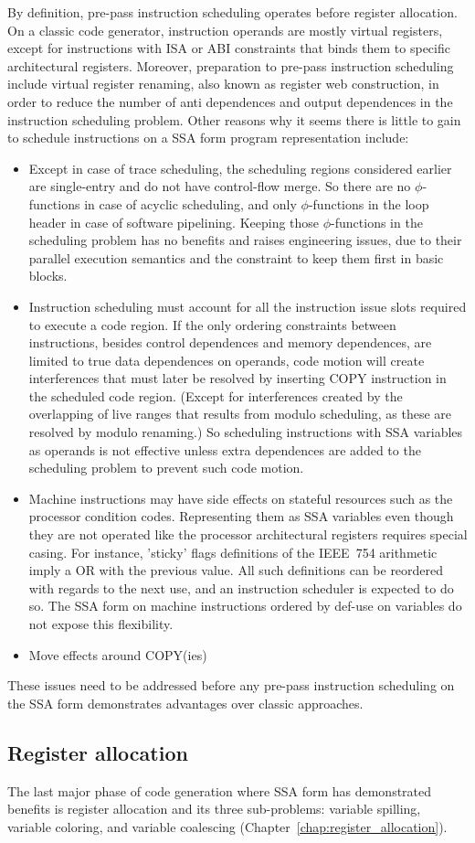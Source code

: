 By definition, pre-pass instruction scheduling operates before register
allocation. On a classic code generator, instruction operands are mostly virtual
registers, except for instructions with ISA or ABI constraints that binds them
to specific architectural registers. Moreover, preparation to pre-pass
instruction scheduling include virtual register renaming, also known as register
web construction, in order to reduce the number of anti dependences and output
dependences in the instruction scheduling problem. Other reasons why it seems
there is little to gain to schedule instructions on a SSA form program
representation include: \begin{itemize}

\item Except in case of trace scheduling, the scheduling regions considered
earlier are single-entry and do not have control-flow merge. So there are no
$\phi$-functions in case of acyclic scheduling, and only $\phi$-functions in the
loop header in case of software pipelining. Keeping those $\phi$-functions in
the scheduling problem has no benefits and raises engineering issues, due to
their parallel execution semantics and the constraint to keep them first in
basic blocks.

\item Instruction scheduling must account for all the instruction issue slots
required to execute a code region. If the only ordering constraints between
instructions, besides control dependences and memory dependences, are limited to
true data dependences on operands, code motion will create interferences that
must later be resolved by inserting COPY instruction in the scheduled code
region. (Except for interferences created by the overlapping of live ranges
that results from modulo scheduling, as these are resolved by modulo renaming.)
So scheduling instructions with SSA variables as operands is not effective
unless extra dependences are added to the scheduling problem to prevent such
code motion. 

\item Machine instructions may have side effects on stateful resources such as
the processor condition codes. Representing them as SSA variables even though
they are not operated like the processor architectural registers requires
special casing. For instance, 'sticky' flags definitions of the IEEE~754
arithmetic imply a OR with the previous value. All such definitions can be
reordered with regards to the next use, and an instruction scheduler is expected
to do so. The SSA form on machine instructions ordered by def-use on variables
do not expose this flexibility.

\item Move effects around COPY(ies) 

\end{itemize} These issues need to be addressed before any pre-pass instruction
scheduling on the SSA form demonstrates advantages over classic approaches.

\subsection{Register allocation}

The last major phase of code generation where SSA form has demonstrated benefits
is register allocation and its three sub-problems: variable spilling, variable
coloring, and variable coalescing (Chapter~\ref{chap:register_allocation}).

